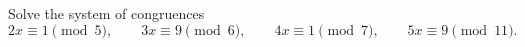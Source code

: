 Solve the system of congruences
\[2x\equiv1\pmod5,\qquad3x\equiv9\pmod6,\qquad4x\equiv1\pmod7,\qquad5x\equiv9\pmod{11}.\]
